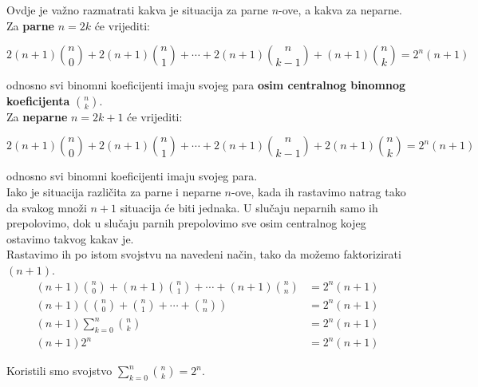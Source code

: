 \documentclass[exam.tex]{subfiles}
\begin{document}
	Ovdje je važno razmatrati kakva je situacija za parne \( n \)-ove, a kakva za neparne. Za \textbf{parne} \( n = 2k \) će vrijediti:
	
	\[ 2(n + 1) \binom{n}{0} + 2(n + 1) \binom{n}{1} + \cdots + 2(n + 1) \binom{n}{k - 1} + (n + 1) \binom{n}{k} = 2^n (n + 1) \]
	
	odnosno svi binomni koeficijenti imaju svojeg para \textbf{osim centralnog binomnog koeficijenta} \( \binom{n}{k} \). \\
	
	Za \textbf{neparne} \( n = 2k + 1 \) će vrijediti:
	
	\[ 2(n + 1) \binom{n}{0} + 2(n + 1) \binom{n}{1} + \cdots 
	+ 2(n + 1) \binom{n}{k - 1}  + 2(n + 1) \binom{n}{k} = 2^n (n + 1) \]
	
	odnosno svi binomni koeficijenti imaju svojeg para. \\
	
	Iako je situacija različita za parne i neparne \( n \)-ove, kada ih rastavimo natrag tako da svakog množi \( n + 1 \) situacija će biti jednaka. U slučaju neparnih samo ih prepolovimo, dok u slučaju parnih prepolovimo sve osim centralnog kojeg ostavimo takvog kakav je. \\
	
	Rastavimo ih po istom svojstvu na navedeni način, tako da možemo faktorizirati \( (n + 1) \).
	\begin{align*}
		(n + 1) \binom{n}{0} + (n + 1) \binom{n}{1} + \cdots + (n + 1) \binom{n}{n} &= 2^n (n + 1) \\
		(n + 1) \left (\binom{n}{0} + \binom{n}{1} + \cdots + \binom{n}{n} \right) &= 2^n (n + 1) \\
		(n + 1) \sum\limits^n_{k=0} \binom{n}{k} &= 2^n (n + 1) \\
		(n + 1) 2^n &= 2^n (n + 1)
	\end{align*}
	
	Koristili smo svojstvo \( \sum\limits^n_{k=0} \binom{n}{k} = 2^n \). 
\end{document}
